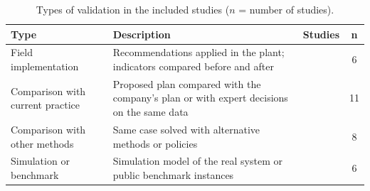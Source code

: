 \begin{table}[!htbp]
\centering
\caption{Types of validation in the included studies ($n$ = number of studies).}
\label{tab:validation}
\scriptsize
\begin{tabular}{|>{\raggedright\arraybackslash}p{2.5cm}|>{\raggedright\arraybackslash}p{4.1cm}|>{\raggedright\arraybackslash}p{3.5cm}|c|}
\hline
\textbf{Type} & \textbf{Description} & \textbf{Studies} & \textbf{n} \\
\hline
Field implementation & Recommendations applied in the plant; indicators compared before and after & \cite{ozcan2021,bulut2021,delgado2026,hall2021,wittbrodt2026,hedayatnia2025} & 6 \\
\hline
Comparison with current practice & Proposed plan compared with the company's plan or with expert decisions on the same data & \cite{rios2025,rios2024,enjavimadar2022,moradi2024,wehbi2026,li2027,gao2024,shaulagara2023,bi2022,bahadir2026,astepe2021} & 11 \\
\hline
Comparison with other methods & Same case solved with alternative methods or policies & \cite{panwar2021,bahrami2021,qiu2026,geng2022,zhou2024,danach2026,tang2026,darko2026} & 8 \\
\hline
Simulation or benchmark & Simulation model of the real system or public benchmark instances & \cite{yang2021,gopalakrishnan2022,dui2025,dui2026,schulze2022,woller2023} & 6 \\
\hline
\end{tabular}
\end{table}

